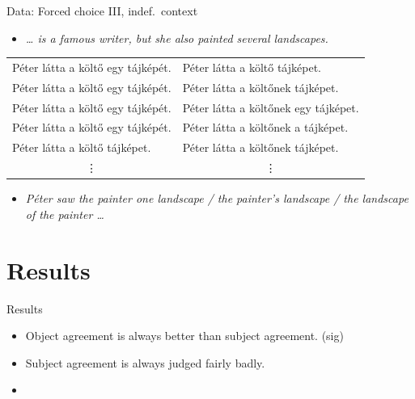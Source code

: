 \documentclass[12pt]{beamer}
\begin{document}
\begin{frame}{Data: Forced choice III, indef.\ context}

\begin{itemize}
    \item \emph{\dots{} is a famous writer, but she also painted \alert{several} landscapes.}
\end{itemize}

{\small
\hspace{-.5cm}\begin{tabulary}{1\linewidth}{ll}
Péter látta a költő \alert{egy} tájképét. & Péter látta a költő tájképet.\\
Péter látta a költő \alert{egy} tájképét. & Péter látta a költő\textcolor{red!70!black}{nek} tájképet.\\
Péter látta a költő \alert{egy} tájképét. & Péter látta a költő\textcolor{red!70!black}{nek} \alert{egy} tájképet.\\
Péter látta a költő \alert{egy} tájképét. & Péter látta a költő\textcolor{red!70!black}{nek} \textcolor{green!70!black}{a} tájképet.\\
Péter látta a költő tájképet.     & Péter látta a költő\textcolor{red!70!black}{nek} tájképet.\\
 & \\
\end{tabulary}
}

\begin{itemize}
    \item \emph{Péter saw the painter \alert{one} landscape / the painter's landscape / \textcolor{green!70!black}{the} landscape \textcolor{red!70!black}{of the} painter \dots}
\end{itemize}

\end{frame}

\section{Results}

\begin{frame}{Results}

    \begin{itemize}

        \item Object agreement is always better than subject agreement. (sig)

        \item Subject agreement is always judged fairly badly.

        \item

    \end{itemize}

\end{frame}
\end{document}
